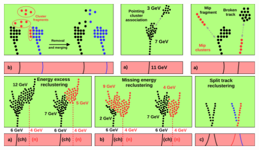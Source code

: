 \documentclass[8pt]{beamer}
\begin{document}
\begin{frame}
\begin{overprint}
       \centering \includegraphics[width=0.8\linewidth]{ILDTopologicalAssociations.pdf}
       \centering \includegraphics[width=0.8\linewidth]{ReclusteringAlgorithmsILD.pdf}
    \end{overprint}
  \end{frame}
\end{document}
